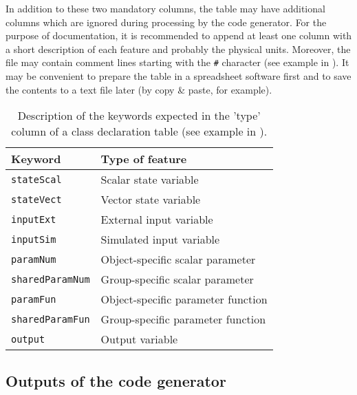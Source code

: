 In addition to these two mandatory columns, the table may have additional columns which are ignored during processing by the code generator. For the purpose of documentation, it is recommended to append at least one column with a short description of each feature and probably the physical units. Moreover, the file may contain comment lines starting with the \verb!#! character (see example in ). It may be  convenient to prepare the table in a spreadsheet software first and to save the contents to a text file later (by copy \& paste, for example).

\begin{table}[htb]
  \caption[Description of the keywords expected in the 'type' column of a class declaration table.]{Description of the keywords expected in the 'type' column of a class declaration table (see example in ). \label{tab:concept-featuretypes}}
  \begin{tabularx}{\columnwidth}{lX} \hline\hline
    Keyword & Type of feature \\ \hline
    \texttt{stateScal} & Scalar state variable \\
    \texttt{stateVect} & Vector state variable \\
    \texttt{inputExt} & External input variable \\
    \texttt{inputSim} & Simulated input variable \\
    \texttt{paramNum} & Object-specific scalar parameter \\
    \texttt{sharedParamNum} & Group-specific scalar parameter \\
    \texttt{paramFun} & Object-specific parameter function \\
    \texttt{sharedParamFun} & Group-specific parameter function \\
    \texttt{output} & Output variable \\
    \hline\hline
  \end{tabularx}
\end{table}

\subsection{Outputs of the code generator} \label{sec:concept-autocode-codegen-output}

